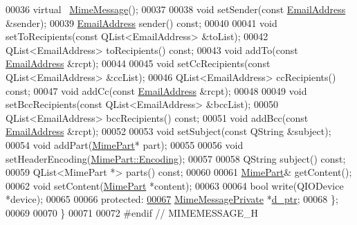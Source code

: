 \begin{DoxyCode}
00036     \textcolor{keyword}{virtual} ~\hyperlink{class_simple_mail_1_1_mime_message}{MimeMessage}();
00037 
00038     \textcolor{keywordtype}{void} setSender(\textcolor{keyword}{const} \hyperlink{class_simple_mail_1_1_email_address}{EmailAddress} &sender);
00039     \hyperlink{class_simple_mail_1_1_email_address}{EmailAddress} sender() \textcolor{keyword}{const};
00040 
00041     \textcolor{keywordtype}{void} setToRecipients(\textcolor{keyword}{const} QList<EmailAddress> &toList);
00042     QList<EmailAddress> toRecipients() \textcolor{keyword}{const};
00043     \textcolor{keywordtype}{void} addTo(\textcolor{keyword}{const} \hyperlink{class_simple_mail_1_1_email_address}{EmailAddress} &rcpt);
00044 
00045     \textcolor{keywordtype}{void} setCcRecipients(\textcolor{keyword}{const} QList<EmailAddress> &ccList);
00046     QList<EmailAddress> ccRecipients() \textcolor{keyword}{const};
00047     \textcolor{keywordtype}{void} addCc(\textcolor{keyword}{const} \hyperlink{class_simple_mail_1_1_email_address}{EmailAddress} &rcpt);
00048 
00049     \textcolor{keywordtype}{void} setBccRecipients(\textcolor{keyword}{const} QList<EmailAddress> &bccList);
00050     QList<EmailAddress> bccRecipients() \textcolor{keyword}{const};
00051     \textcolor{keywordtype}{void} addBcc(\textcolor{keyword}{const} \hyperlink{class_simple_mail_1_1_email_address}{EmailAddress} &rcpt);
00052 
00053     \textcolor{keywordtype}{void} setSubject(\textcolor{keyword}{const} QString &subject);
00054     \textcolor{keywordtype}{void} addPart(\hyperlink{class_simple_mail_1_1_mime_part}{MimePart}* part);
00055 
00056     \textcolor{keywordtype}{void} setHeaderEncoding(\hyperlink{class_simple_mail_1_1_mime_part_ae67a2f5406958b95b18bf31a7bbeb5c9}{MimePart::Encoding});
00057 
00058     QString subject() \textcolor{keyword}{const};
00059     QList<MimePart *> parts() \textcolor{keyword}{const};
00060 
00061     \hyperlink{class_simple_mail_1_1_mime_part}{MimePart}& getContent();
00062     \textcolor{keywordtype}{void} setContent(\hyperlink{class_simple_mail_1_1_mime_part}{MimePart} *content);
00063 
00064     \textcolor{keywordtype}{bool} write(QIODevice *device);
00065 
00066 \textcolor{keyword}{protected}:
\hyperlink{class_simple_mail_1_1_mime_message_abb70ca7430a820f75203dd6bd66cc47f}{00067}     \hyperlink{class_simple_mail_1_1_mime_message_private}{MimeMessagePrivate} *\hyperlink{class_simple_mail_1_1_mime_message_abb70ca7430a820f75203dd6bd66cc47f}{d\_ptr};
00068 \};
00069 
00070 \}
00071 
00072 \textcolor{preprocessor}{#endif // MIMEMESSAGE\_H}
\end{DoxyCode}
